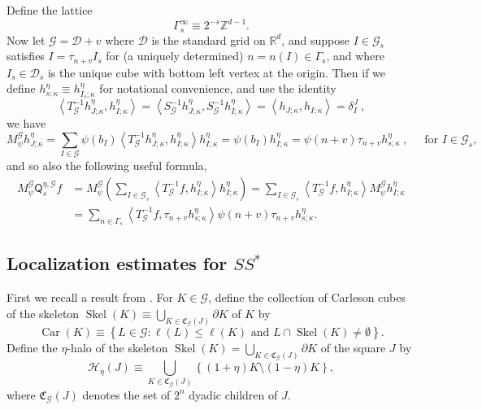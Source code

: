 \documentclass{amsart}%
\theoremstyle{plain}
\numberwithin{equation}{section}
\begin{document}
Define the lattice
\begin{equation}
\Gamma_{s}^{\infty}\equiv2^{-s}\mathbb{Z}^{d-1}.\label{def Gamma_s}%
\end{equation}
Now let $\mathcal{G}=\mathcal{D}+v$ where $\mathcal{D}$ is the standard grid
on $\mathbb{R}^{d}$, and suppose $I\in\mathcal{G}_{s}$ satisfies $I=\tau
_{n+v}I_{s}$ for (a uniquely determined) $n=n\left(  I\right)  \in\Gamma_{s}$,
and where $I_{s}\in\mathcal{D}_{s}$ is the unique cube with bottom left vertex
at the origin. Then if we define $h_{s;\kappa}^{\eta}\equiv h_{I_{s};\kappa
}^{\eta}$ for notational convenience, and use the identity%
\[
\left\langle T_{\mathcal{G}}^{-1}h_{J;\kappa}^{\eta},h_{I;\kappa}^{\eta
}\right\rangle =\left\langle S_{\mathcal{G}}^{-1}h_{J;\kappa}^{\eta
},S_{\mathcal{G}}^{-1}h_{I;\kappa}^{\eta}\right\rangle =\left\langle
h_{J;\kappa},h_{I;\kappa}\right\rangle =\delta_{I}^{J}\ ,
\]
we have%
\[
M_{\psi}^{\mathcal{G}}h_{J;\kappa}^{\eta}=\sum_{I\in\mathcal{G}}\psi\left(
b_{I}\right)  \left\langle T_{\mathcal{G}}^{-1}h_{J;\kappa}^{\eta}%
,h_{I;\kappa}^{\eta}\right\rangle h_{I;\kappa}^{\eta}=\psi\left(
b_{I}\right)  h_{I;\kappa}^{\eta}=\psi\left(  n+v\right)  \tau_{n+v}%
h_{s;\kappa}^{\eta}\ ,\ \ \ \ \ \text{\ for }I\in\mathcal{G}_{s},
\]
and so also the following useful formula,%
\begin{align}
M_{\psi}^{\mathcal{G}}\mathsf{Q}_{s}^{\eta,\mathcal{G}}f  & =M_{\psi
}^{\mathcal{G}}\left(  \sum_{I\in\mathcal{G}_{s}}\left\langle T_{\mathcal{G}%
}^{-1}f,h_{I;\kappa}^{\eta}\right\rangle h_{I;\kappa}^{\eta}\right)
=\sum_{I\in\mathcal{G}_{s}}\left\langle T_{\mathcal{G}}^{-1}f,h_{I;\kappa
}^{\eta}\right\rangle M_{\psi}^{\mathcal{G}}h_{I;\kappa}^{\eta}%
\label{useful form}\\
& =\sum_{n\in\Gamma_{s}}\left\langle T_{\mathcal{G}}^{-1}f,\tau_{n+v}%
h_{s;\kappa}^{\eta}\right\rangle \psi\left(  n+v\right)  \tau_{n+v}%
h_{s;\kappa}^{\eta}.\nonumber
\end{align}


\subsection{Localization estimates for $SS^{\ast}$}

First we recall a result from \cite[Lemma 19]{Saw7}. For $K\in\mathcal{G}$,
define the collection of Carleson cubes of the skeleton $\operatorname*{Skel}%
\left(  K\right)  \equiv\bigcup_{K\in\mathfrak{C}_{\mathcal{G}}\left(
J\right)  }\partial K$ of $K$ by%
\[
\operatorname*{Car}\left(  K\right)  \equiv\left\{  L\in\mathcal{G}%
:\ell\left(  L\right)  \leq\ell\left(  K\right)  \text{ and }L\cap
\operatorname*{Skel}\left(  K\right)  \neq\emptyset\right\}  .
\]
Define the $\eta$-halo of the skeleton $\operatorname*{Skel}\left(  K\right)
=\bigcup_{K\in\mathfrak{C}_{\mathcal{G}}\left(  J\right)  }\partial K$ of the
square $J$ by
\[
\mathcal{H}_{\eta}\left(  J\right)  \equiv\bigcup_{K\in\mathfrak{C}%
_{\mathcal{G}}\left(  J\right)  }\left\{  \left(  1+\eta\right)
K\setminus\left(  1-\eta\right)  K\right\}  ,
\]
where $\mathfrak{C}_{\mathcal{G}}\left(  J\right)  $ denotes the set of
$2^{n}$ dyadic children of $J$.
\end{document}
